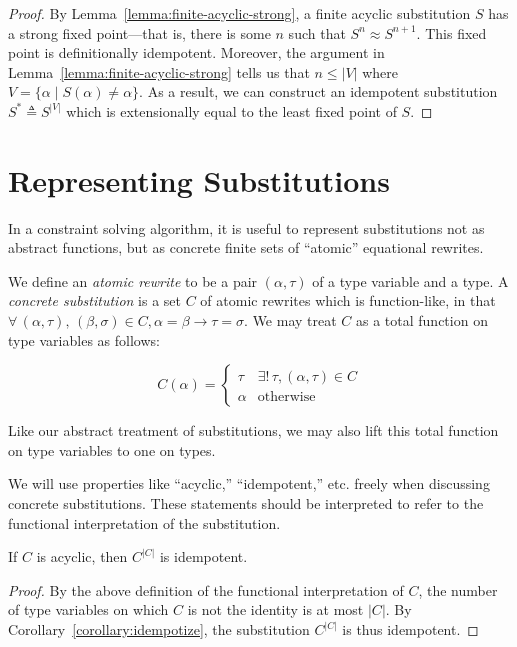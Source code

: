 \documentclass[10pt, letterpaper, oneside]{article}
\begin{document}
\begin{proof}
  By Lemma~\ref{lemma:finite-acyclic-strong}, a finite acyclic substitution \(S\) has a strong fixed point---that is, there is some \(n\) such that \(S^n \approx S^{n + 1}\). This fixed point is definitionally idempotent. Moreover, the argument in Lemma~\ref{lemma:finite-acyclic-strong} tells us that \(n \le |V|\) where \(V = \{\alpha \mid S(\alpha) \ne \alpha\}\). As a result, we can construct an idempotent substitution \(S^\ast \triangleq S^{|V|}\) which is extensionally equal to the least fixed point of \(S\).
\end{proof}

\section{Representing Substitutions}

In a constraint solving algorithm, it is useful to represent substitutions not as abstract functions, but as concrete finite sets of ``atomic'' equational rewrites.

We define an \emph{atomic rewrite} to be a pair \((\alpha, \tau)\) of a type variable and a type. A \emph{concrete substitution} is a set \(C\) of atomic rewrites which is function-like, in that \(\forall\, (\alpha, \tau),\,(\beta, \sigma) \in C, \alpha = \beta \to \tau = \sigma\). We may treat \(C\) as a total function on type variables as follows:

\begin{equation*}
  C(\alpha) =
  \begin{cases}
    \tau & \exists!\, \tau, (\alpha, \tau) \in C\\
    \alpha & \textrm{otherwise}
  \end{cases}
\end{equation*}

Like our abstract treatment of substitutions, we may also lift this total function on type variables to one on types.

We will use properties like ``acyclic,'' ``idempotent,'' etc. freely when discussing concrete substitutions. These statements should be interpreted to refer to the functional interpretation of the substitution.

\begin{corollary}
  If \(C\) is acyclic, then \(C^{|C|}\) is idempotent.
\end{corollary}

\begin{proof}
  By the above definition of the functional interpretation of \(C\), the number of type variables on which \(C\) is not the identity is at most \(|C|\). By Corollary~\ref{corollary:idempotize}, the substitution \(C^{|C|}\) is thus idempotent.
\end{proof}
\end{document}
